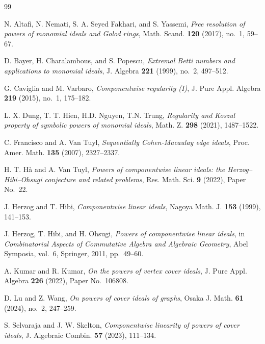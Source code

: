 \documentclass[12pt]{amsart}
\theoremstyle{definition}
\theoremstyle{remark}
\begin{document}
\begin{thebibliography}{99}


 N. Altafi, N. Nemati, S. A. Seyed Fakhari, and S. Yassemi, \emph{Free resolution of powers of monomial ideals and Golod rings}, Math. Scand. \textbf{120} (2017), no.~1, 59--67.


 D. Bayer, H. Charalambous, and S. Popescu,
\emph{Extremal Betti numbers and applications to monomial ideals},
J. Algebra \textbf{221} (1999), no.~2, 497--512.


 G. Caviglia and M. Varbaro, \emph{Componentwise regularity (I)}, J. Pure Appl. Algebra \textbf{219} (2015), no.~1, 175--182.



 L. X. Dung, T. T. Hien, H.D. Nguyen, T.N. Trung, \emph{Regularity and Koszul property of symbolic powers of monomial ideals}, Math. Z. \textbf{298} (2021), 1487--1522.




 C. Francisco and A. Van Tuyl,
\emph{Sequentially Cohen-Macaulay edge ideals}, Proc. Amer. Math. \textbf{135} (2007), 2327--2337. 

 H. T. H\`a and A. Van Tuyl,
\emph{Powers of componentwise linear ideals: the Herzog--Hibi--Ohsugi conjecture and related problems}, Res. Math. Sci. \textbf{9} (2022), Paper No.~22. 

 J. Herzog and T. Hibi, \emph{Componentwise linear ideals}, Nagoya Math. J. \textbf{153} (1999), 141--153.


 J. Herzog, T. Hibi, and H. Ohsugi,
\emph{Powers of componentwise linear ideals},
in \emph{Combinatorial Aspects of Commutative Algebra and Algebraic Geometry}, Abel Symposia, vol.~6, Springer, 2011, pp.~49--60.


 A. Kumar and R. Kumar,
\emph{On the powers of vertex cover ideals},
J. Pure Appl. Algebra \textbf{226} (2022), Paper No.~106808.


D. Lu and Z. Wang, \emph{On powers of cover ideals of graphs},
Osaka J. Math. \textbf{61} (2024), no.~2, 247--259.


 S. Selvaraja and J. W. Skelton,
\emph{Componentwise linearity of powers of cover ideals},
J. Algebraic Combin. \textbf{57} (2023), 111--134.


\end{thebibliography}
\end{document}

